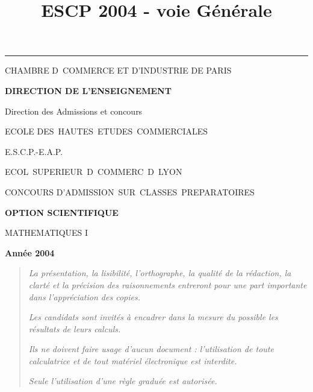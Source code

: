 \documentclass[11pt]{article}%
\title{\bf \vspace{-2cm} ESCP 2004 - voie Générale} %
\author{} %
\date{} %
\begin{document}
\maketitle %
\vspace{-1.4cm}\hrule %
\thispagestyle{fancy}

\vspace*{.2cm}




\begin{center}
{\small CHAMBRE D\E\ COMMERCE ET D'INDUSTRIE DE PARIS}

\textbf{DIRECTION DE L'ENSEIGNEMENT}

Direction des Admissions et concours

\underline{\hspace*{3cm}}

{\Large ECOLE DES\ HAUTES\ ETUDES\ COMMERCIALES}

{\Large E.S.C.P.-E.A.P.}

{\Large ECOL\E\ SUPERIEUR\E\ D\E\ COMMERC\E\ D\E\ LYON}{\large }

CONCOURS D'ADMISSION\ SUR\ CLASSES\ PREPARATOIRES

\underline{\hspace*{3cm}}

\textbf{OPTION SCIENTIFIQUE}

{\Large MATHEMATIQUES I}

\textbf{Année 2004}

\underline{\hspace*{3cm}}
\end{center}

\begin{quotation}
\noindent \textsl{La présentation, la lisibilité, l'orthographe, la
qualité
de la rédaction, la clarté et la précision des raisonnements entreront
pour
une part importante dans l'appréciation des copies.}

\noindent \textsl{Les candidats sont invités à encadrer dans la mesure
du
possible les résultats de leurs calculs.}

\noindent \textsl{Ils ne doivent faire usage d'aucun document :
l'utilisation de toute calculatrice et de tout matériel électronique
est
interdite.}

\noindent \textsl{Seule l'utilisation d'une règle graduée est
autorisée.}

\noindent \textsl{\hrulefill }
\end{quotation}
\end{document}
